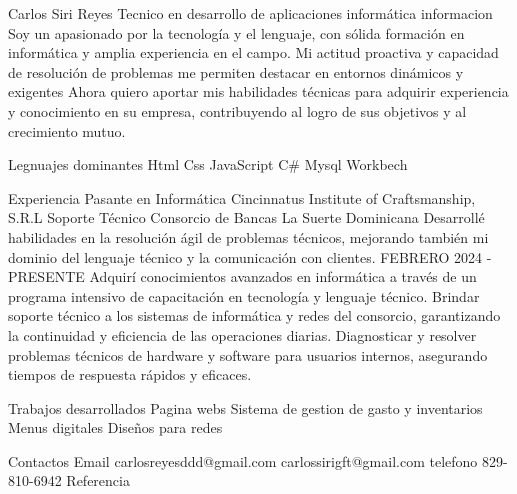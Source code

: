 Carlos Siri Reyes
Tecnico en desarrollo de aplicaciones informática
informacion 
Soy un apasionado por la tecnología y el lenguaje, con sólida formación en informática y amplia experiencia en el campo.    
Mi actitud proactiva y capacidad de resolución de problemas me permiten destacar en entornos dinámicos y exigentes
Ahora quiero aportar mis habilidades técnicas para adquirir experiencia y conocimiento en su empresa, contribuyendo al logro de sus objetivos y al crecimiento mutuo.

Legnuajes dominantes
Html
Css
JavaScript
C#
Mysql Workbech

Experiencia
Pasante en Informática
Cincinnatus Institute of Craftsmanship, S.R.L
Soporte Técnico
Consorcio de Bancas La Suerte Dominicana
Desarrollé habilidades en la resolución ágil de problemas técnicos,
mejorando también mi dominio del lenguaje técnico y la
comunicación con clientes.
FEBRERO 2024 - PRESENTE
Adquirí conocimientos avanzados en informática a través de un
programa intensivo de capacitación en tecnología y lenguaje técnico.
Brindar soporte técnico a los sistemas de informática y redes del
consorcio, garantizando la continuidad y eficiencia de las operaciones
diarias.
Diagnosticar y resolver problemas técnicos de hardware y software
para usuarios internos, asegurando tiempos de respuesta rápidos y
eficaces.

Trabajos desarrollados
Pagina webs 
Sistema de gestion de gasto y inventarios 
Menus digitales
Diseños para redes

Contactos 
Email
carlosreyesddd@gmail.com
carlossirigft@gmail.com
telefono 
829-810-6942
Referencia 

